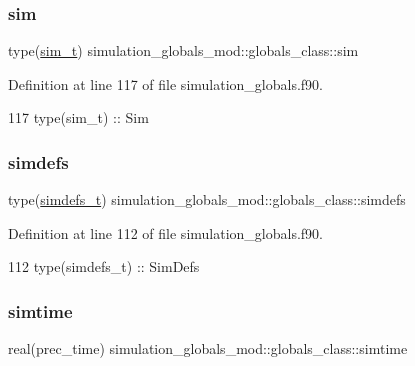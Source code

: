 \subsubsection{\texorpdfstring{sim}{sim}}
{\footnotesize\ttfamily type(\mbox{\hyperlink{structsimulation__globals__mod_1_1sim__t}{sim\+\_\+t}}) simulation\+\_\+globals\+\_\+mod\+::globals\+\_\+class\+::sim\hspace{0.3cm}{\ttfamily [private]}}



Definition at line 117 of file simulation\+\_\+globals.\+f90.


\begin{DoxyCode}
117         \textcolor{keywordtype}{type}(sim\_t)         :: Sim
\end{DoxyCode}
\mbox{\label{structsimulation__globals__mod_1_1globals__class_aa066434c9dc6147331dce613422568ae}} 
\subsubsection{\texorpdfstring{simdefs}{simdefs}}
{\footnotesize\ttfamily type(\mbox{\hyperlink{structsimulation__globals__mod_1_1simdefs__t}{simdefs\+\_\+t}}) simulation\+\_\+globals\+\_\+mod\+::globals\+\_\+class\+::simdefs\hspace{0.3cm}{\ttfamily [private]}}



Definition at line 112 of file simulation\+\_\+globals.\+f90.


\begin{DoxyCode}
112         \textcolor{keywordtype}{type}(simdefs\_t)     :: SimDefs
\end{DoxyCode}
\mbox{\label{structsimulation__globals__mod_1_1globals__class_ab28ea8e0cca87c11a33e4acfb3d3b293}} 
\subsubsection{\texorpdfstring{simtime}{simtime}}
{\footnotesize\ttfamily real(prec\+\_\+time) simulation\+\_\+globals\+\_\+mod\+::globals\+\_\+class\+::simtime\hspace{0.3cm}{\ttfamily [private]}}



